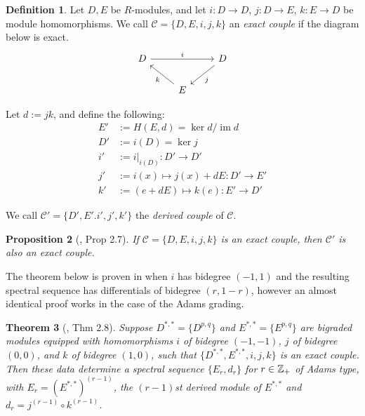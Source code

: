 \documentclass[11pt, titlepage]{article} %
\def\inte{\ensuremath\mathbb{Z}}
\DeclareMathOperator{\im}{im}
\numberwithin{equation}{subsection}
\theoremstyle{plain}
\newtheorem{theorem}{Theorem}[subsection]
\newtheorem{proposition}[theorem]{Proposition}
\theoremstyle{definition}
\newtheorem{definition}[theorem]{Definition}
\begin{document}
\begin{definition}
Let \(D, E\) be \(R\)-modules, and let \(i : D \to D\), \(j : D\to E\), \(k : E \to D\) be module homomorphisms. We call \(\mathcal{C}=\{D, E, i, j, k\}\) an \textit{exact couple} if the diagram below is exact.
\[\begin{tikzcd}
 D \arrow[rr, "i"] && D \arrow[dl, "j"] \\ 
  & E \arrow[ul, "k"] &  
 \end{tikzcd}\] 
\end{definition}

Let \(d:=jk\), and define the following:
\begin{align*}
E'&:=H(E, d)=\ker d/\im d\\
D'&:=i(D)=\ker j\\
i'&:=i|_{i(D)} : D'\to D'\\
j'&:=i(x)\mapsto j(x)+dE : D'\to E'\\
k'&:=(e+dE)\mapsto k(e) : E' \to D'
\end{align*}

We call \(\mathcal{C}'=\{D', E'. i', j', k'\}\) the \textit{derived couple} of \(\mathcal{C}\). 

\begin{proposition}[\autocite{spectral_sequences}, Prop 2.7]
If \(\mathcal{C}=\{D, E, i, j, k\}\) is an exact couple, then \(\mathcal{C}'\) is also an exact couple.
\end{proposition}

The theorem below is proven in \autocite{spectral_sequences} when \(i\) has bidegree \((-1, 1)\) and the resulting spectral sequence has differentials of bidegree \((r, 1-r)\), however an almost identical proof works in the case of the Adams grading. 

\begin{theorem}[{\autocite{spectral_sequences}, Thm 2.8}]\label{2503301131}
Suppose \(D^{*,*}=\{D^{p,q}\}\) and \(E^{*,*}=\{E^{p,q}\}\) are bigraded modules equipped with homomorphisms \(i\) of bidegree \((-1,-1)\), \(j\) of bidegree \((0,0)\), and \(k\) of bidegree \((1,0)\), such that \(\{D^{*,*}, E^{*,*}, i, j, k\}\) is an exact couple. Then these data determine a spectral sequence \(\{E_r, d_r\}\) for \(r\in \inte_+\) of Adams type, with \(E_r=(E^{*,*})^{(r-1)}\), the \((r-1)\)st derived module of \(E^{*,*}\) and \(d_r=j^{(r-1)}\circ k^{(r-1)}\).
\end{theorem}
\end{document}
